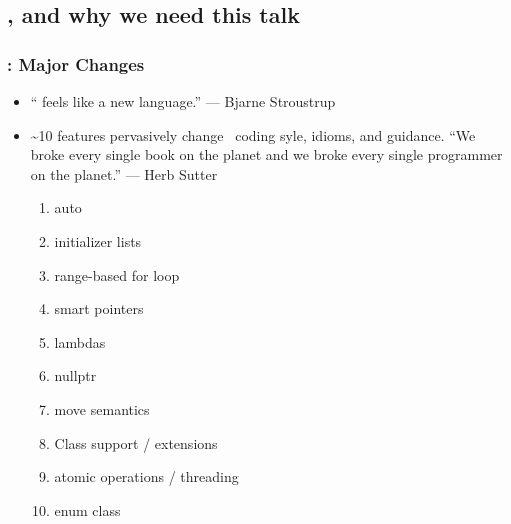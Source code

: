\lyxframeend{}\subsection[\CC 11]{{}, and why we need this talk}


\begin{frame}[fragile,t]
\frametitle{ : Major Changes}

\begin{itemize}

  \item \textquotedblleft{} feels like a new language.\textquotedblright{} --- Bjarne Stroustrup
    \pause{}

  \item \textasciitilde{}10 features pervasively change \CC\ coding
    syle, idioms, and guidance. {}``We broke every single book on the
    planet and we broke every single programmer on the planet.'' ---
    Herb Sutter

    \pause{}
{\scriptsize
    \begin{enumerate}
    \item auto
    \item initializer lists
    \item range-based for loop
    \item smart pointers
    \item lambdas
    \item nullptr
    \item move semantics
    \item Class support / extensions
    \item atomic operations / threading
    \item enum class
    \end{enumerate}
}
\end{itemize}

\end{frame}

\lyxframeend{}


